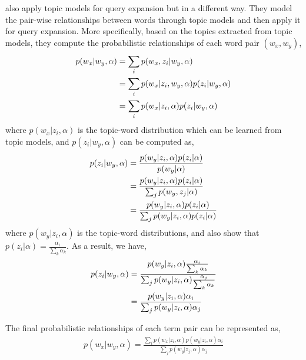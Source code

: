 \cite{Park-2009} also apply topic models for query expansion but in a
different way. They model the pair-wise relationships between words
through topic models and then apply it for query expansion. More
specifically, based on the topics extracted from topic models, they
compute the probabilistic relationships of each word pair $(w_x,
w_y)$,
\begin{align}
p(w_x|w_y, \alpha) &= \sum_i p(w_x, z_i | w_y, \alpha) \\
&= \sum_i p(w_x | z_i, w_y, \alpha) p(z_i | w_y, \alpha) \notag\\
&= \sum_i p(w_x|z_i, \alpha) p(z_i|w_y, \alpha) \notag
\end{align}
where $p(w_x|z_i, \alpha)$ is the topic-word distribution which can be learned from topic models, and $p(z_i|w_y, \alpha)$ can be computed as,
\begin{align}
p(z_i|w_y, \alpha) &= \frac{p(w_y|z_i,\alpha)p(z_i|\alpha)}{p(w_y|\alpha)} \\
&= \frac{p(w_y|z_i,\alpha)p(z_i|\alpha)}{\sum_j p(w_y, z_j|\alpha)} \notag\\
&= \frac{p(w_y|z_i,\alpha)p(z_i|\alpha)}{\sum_j p(w_y|z_i,\alpha)p(z_i|\alpha)} \notag
\end{align}
where $p(w_y|z_i,\alpha)$ is the topic-word distributions, and \cite{Park-2009} also show that $p(z_i|\alpha) = \frac{\alpha_i}{\sum_k \alpha_k}$.
As a result, we have,
\begin{align}
p(z_i|w_y, \alpha) &= \frac{p(w_y|z_i,\alpha) \frac{\alpha_i}{\sum_k \alpha_k} }{\sum_j p(w_y|z_i,\alpha) \frac{\alpha_j}{\sum_k \alpha_k}} \\
&= \frac{p(w_y|z_i,\alpha) \alpha_i}{\sum_j p(w_y|z_i,\alpha) \alpha_j} \notag
\end{align}

The final probabilistic relationships of each term pair  can be represented as,
\begin{align}
p(w_x|w_y, \alpha) = \frac{\sum_i p(w_x|z_i, \alpha) p(w_y|z_i,\alpha) \alpha_i }{\sum_j p(w_y|z_j,\alpha) \alpha_j}
\end{align}

